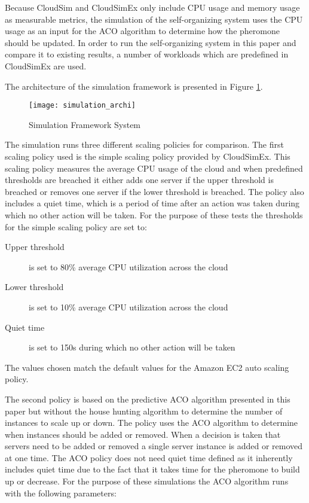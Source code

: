 \documentclass[conference]{IEEEtran}
\begin{document}
Because CloudSim and CloudSimEx only include CPU usage and memory usage as measurable metrics, the simulation of the self-organizing system uses the CPU usage as an input for the ACO algorithm to determine how the pheromone should be updated. In order to run the self-organizing system in this paper and compare it to existing results, a number of workloads which are predefined in CloudSimEx are used.

The architecture of the simulation framework is presented in Figure \ref{fig:simulation-design}.

\begin{figure}
	\centering
	\texttt{[image: simulation\_archi]}
	\caption{Simulation Framework System}
	\label{fig:simulation-design}
\end{figure}

The simulation runs three different scaling policies for comparison. The first scaling policy used is the simple scaling policy provided by CloudSimEx. This scaling policy measures the average CPU usage of the cloud and when predefined thresholds are breached it either adds one server if the upper threshold is breached or removes one server if the lower threshold is breached. The policy also includes a quiet time, which is a period of time after an action was taken during which no other action will be taken. For the purpose of these tests the thresholds for the simple scaling policy are set to:

\begin{description}
	\item[Upper threshold] is set to 80\% average CPU utilization across the cloud
	\item[Lower threshold] is set to 10\% average CPU utilization across the cloud
	\item[Quiet time] is set to 150s during which no other action will be taken
\end{description}

The values chosen match the default values for the Amazon EC2 auto scaling policy.

The second policy is based on the predictive ACO algorithm presented in this paper but without the house hunting algorithm to determine the number of instances to scale up or down. The policy uses the ACO algorithm to determine when instances should be added or removed. When a decision is taken that servers need to be added or removed a single server instance is added or removed at one time. The ACO policy does not need quiet time defined as it inherently includes quiet time due to the fact that it takes time for the pheromone to build up or decrease. For the purpose of these simulations the ACO algorithm runs with the following parameters:
\end{document}
